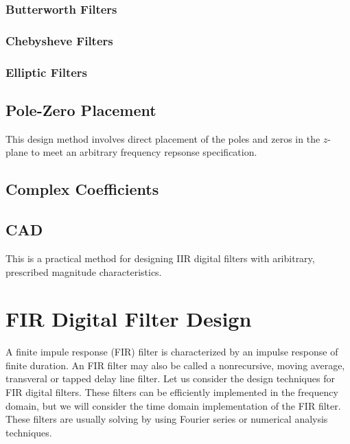 \documentclass[11pt]{book}
\theoremstyle{example}
\begin{document}
\subsubsection{Butterworth Filters}



\subsubsection{Chebysheve Filters}

\subsubsection{Elliptic Filters}

\subsection{Pole-Zero Placement}

This design method involves direct placement of the poles and zeros in the $z$-plane to meet an arbitrary frequency repsonse specification.

\subsection{Complex Coefficients}

\subsection{CAD}

This is a practical method for designing IIR digital filters with aribitrary, prescribed magnitude characteristics.

\section{FIR Digital Filter Design}

A finite impule response (FIR) filter is characterized by an impulse response of finite duration. An FIR filter may also be called a nonrecursive, moving average, transveral or tapped delay line filter. Let us consider the design techniques for FIR digital filters. These filters can be efficiently implemented in the frequency domain, but we will consider the time domain implementation of the FIR filter. These filters are usually solving by using Fourier series or numerical analysis techniques.
\end{document}
